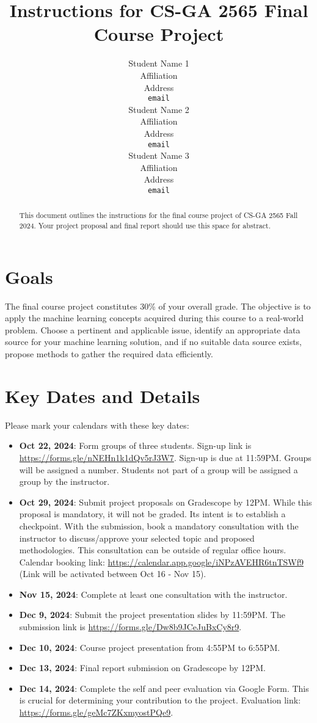 \documentclass{article}
\title{Instructions for CS-GA 2565 Final Course Project}
\author{
  Student Name 1 \\
  Affiliation \\
  Address \\
  \texttt{email} \\
  \And
  Student Name 2 \\
  Affiliation \\
  Address \\
  \texttt{email} \\
  \And
  Student Name 3 \\
  Affiliation \\
  Address \\
  \texttt{email} \\
}
\begin{document}
\maketitle

\begin{abstract}
  This document outlines the instructions for the final course project of CS-GA 2565 Fall 2024. Your project proposal and final report should use this space for abstract.
\end{abstract}

\section{Goals}
The final course project constitutes 30\% of your overall grade. The objective is to apply the machine learning concepts acquired during this course to a real-world problem. Choose a pertinent and applicable issue, identify an appropriate data source for your machine learning solution, and if no suitable data source exists, propose methods to gather the required data efficiently.

\section{Key Dates and Details}
Please mark your calendars with these key dates:
\begin{itemize}
  \item \textbf{Oct 22, 2024}: Form groups of three students. Sign-up link is \url{https://forms.gle/nNEHn1k1dQv5rJ3W7}. Sign-up is due at 11:59PM. Groups will be assigned a number. Students not part of a group will be assigned a group by the instructor.
  \item \textbf{Oct 29, 2024}: Submit project proposals on Gradescope by 12PM. While this proposal is mandatory, it will not be graded. Its intent is to establish a checkpoint. With the submission, book a mandatory consultation with the instructor to discuss/approve your selected topic and proposed methodologies. This consultation can be outside of regular office hours. Calendar booking link: \url{https://calendar.app.google/iNPzAVEHR6tnTSWf9} (Link will be activated between Oct 16 - Nov 15).
  \item \textbf{Nov 15, 2024}: Complete at least one consultation with the instructor.
  \item \textbf{Dec 9, 2024}: Submit the project presentation slides by 11:59PM. The submission link is \url{https://forms.gle/Dw8b9JCeJuBxCy8r9}.
  \item \textbf{Dec 10, 2024}: Course project presentation from 4:55PM to 6:55PM.
  \item \textbf{Dec 13, 2024}: Final report submission on Gradescope by 12PM.
  \item \textbf{Dec 14, 2024}: Complete the self and peer evaluation via Google Form. This is crucial for determining your contribution to the project. Evaluation link: \url{https://forms.gle/geMc7ZKxmyostPQe9}.
\end{itemize}
\end{document}
